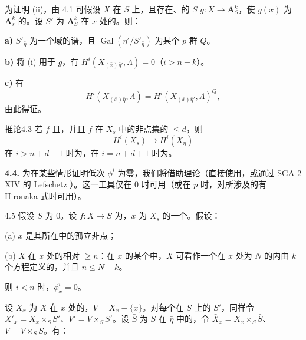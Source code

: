 为证明 (ii)，由 4.1 可假设 $X$ 在 $S$ 上，且存在、的 $S$  $g:X\to\mathbf A_S^k$，使 $g(x)$ 为 $\mathbf A_s^k$ 的。设 $S'$ 为 $\mathbf A_S^k$ 在 $\bar x$ 处的。则：

\textbf{a)} $S'_{\bar\eta}$ 为一个域的谱，且 $\operatorname{Gal}(\bar\eta'/S'_{\bar\eta})$ 为某个 $p$ 群 $Q$。

\textbf{b)} 将 (i) 用于 $g$，有 $H^i(X_{(\bar x)\bar\eta'},\Lambda)=0$（$i>n-k$）。

\textbf{c)} 有
\[
H^i(X_{(\bar x)\bar\eta},\Lambda)
=H^i(X_{(\bar x)\bar\eta'},\Lambda)^Q,
\]
由此得证。

\begin{SGAresult}{推论}{4.3}
若 $f$ 且，并且 $f$ 在 $X_s$ 中的非点集的 $\le d$，则
\[
H^i(X_s)\longrightarrow H^i(X_{\bar\eta})
\]
在 $i>n+d+1$ 时为，在 $i=n+d+1$ 时为。
\end{SGAresult}
\textbf{4.4.} 为在某些情形证明低次 $\phi^i$ 为零，我们将借助理论（直接使用，或通过 SGA 2 XIV 的 Lefschetz ）。这一工具仅在 $0$ 时可用（或在 $p$ 时，对所涉及的有 Hironaka 式时可用）。

\begin{SGAresult}{}{4.5}
假设 $S$ 为 $0$。设 $f:X\to S$ 为，$x$ 为 $X_s$ 的一个。假设：

\textup{(a)} $x$ 是其所在中的孤立非点；

\textup{(b)} $X$ 在 $x$ 处的相对 $\ge n$：在 $x$ 的某个中，$X$ 可看作一个在 $x$ 处为 $N$ 的内由 $k$ 个方程定义的，并且 $n\le N-k$。

则 $i<n$ 时，$\phi_x^i=0$。
\end{SGAresult}
设 $X_x$ 为 $X$ 在 $x$ 处的，$V=X_x-\{x\}$。对每个在 $S$ 上的 $S'$，同样令 $X'_x=X_x\times_SS'$、$V'=V\times_SS'$。设 $\bar S$ 为 $S$ 在 $\bar\eta$ 中的，令 $\bar X_x=X_x\times_S\bar S$、$\bar V=V\times_S\bar S$。有：

